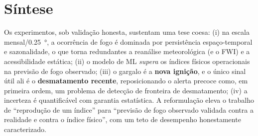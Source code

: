 \section{Síntese}
\label{sec:oco_sintese}

Os experimentos, sob validação honesta, sustentam uma tese coesa: (i) na escala
mensal/\SI{0,25}{\degree}, a ocorrência de fogo é dominada por persistência espaço-temporal e
sazonalidade, o que torna redundantes a reanálise meteorológica (e o FWI) e a acessibilidade
estática; (ii) o modelo de ML \emph{supera} os índices físicos operacionais na previsão de
fogo observado; (iii) o gargalo é a \textbf{nova ignição}, e o único sinal útil ali é o
\textbf{desmatamento recente}, reposicionando o alerta precoce como, em primeira ordem, um
problema de detecção de fronteira de desmatamento; (iv) a incerteza é quantificável com
garantia estatística. A reformulação eleva o trabalho de ``reprodução de um índice'' para
``previsão de fogo observado validada contra a realidade e contra o índice físico'', com um
teto de desempenho honestamente caracterizado.
